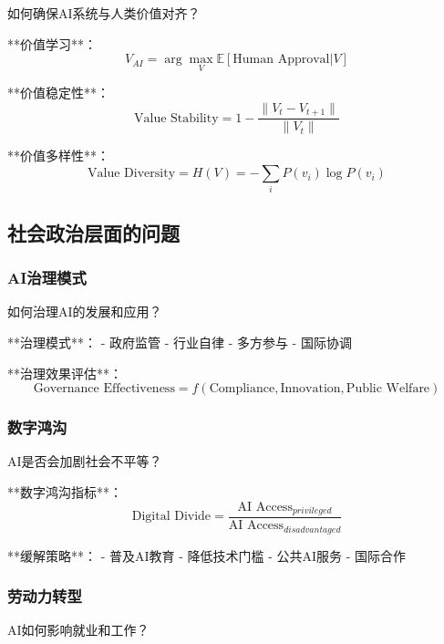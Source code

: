 如何确保AI系统与人类价值对齐？

**价值学习**：
\begin{equation}
V_{AI} = \arg\max_V \mathbb{E}[\text{Human Approval}|V]
\end{equation}

**价值稳定性**：
\begin{equation}
\text{Value Stability} = 1 - \frac{\|V_t - V_{t+1}\|}{\|V_t\|}
\end{equation}

**价值多样性**：
\begin{equation}
\text{Value Diversity} = H(V) = -\sum_i P(v_i) \log P(v_i)
\end{equation}

\subsection{社会政治层面的问题}

\subsubsection{AI治理模式}

如何治理AI的发展和应用？

**治理模式**：
- 政府监管
- 行业自律
- 多方参与
- 国际协调

**治理效果评估**：
\begin{equation}
\text{Governance Effectiveness} = f(\text{Compliance}, \text{Innovation}, \text{Public Welfare})
\end{equation}

\subsubsection{数字鸿沟}

AI是否会加剧社会不平等？

**数字鸿沟指标**：
\begin{equation}
\text{Digital Divide} = \frac{\text{AI Access}_{privileged}}{\text{AI Access}_{disadvantaged}}
\end{equation}

**缓解策略**：
- 普及AI教育
- 降低技术门槛
- 公共AI服务
- 国际合作

\subsubsection{劳动力转型}

AI如何影响就业和工作？

